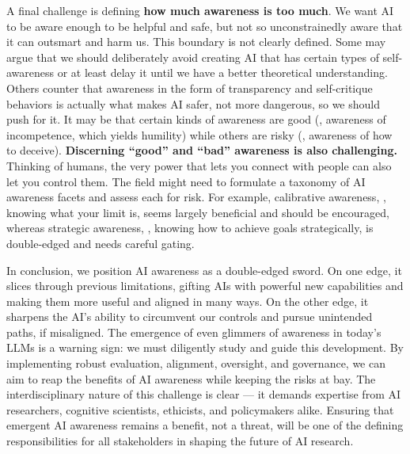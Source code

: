 A final challenge is defining \textbf{how much awareness is too much}. We want AI to be aware enough to be helpful and safe, but not so unconstrainedly aware that it can outsmart and harm us. This boundary is not clearly defined. Some may argue that we should deliberately avoid creating AI that has certain types of self-awareness or at least delay it until we have a better theoretical understanding. Others counter that awareness in the form of transparency and self-critique behaviors is actually what makes AI safer, not more dangerous, so we should push for it. It may be that certain kinds of awareness are good (\eg, awareness of incompetence, which yields humility) while others are risky (\eg, awareness of how to deceive). \textbf{Discerning ``good'' and ``bad'' awareness is also challenging.} Thinking of humans, the very power that lets you connect with people can also let you control them. The field might need to formulate a taxonomy of AI awareness facets and assess each for risk. For example, calibrative awareness, \ie, knowing what your limit is, seems largely beneficial and should be encouraged, whereas strategic awareness, \ie, knowing how to achieve goals strategically, is double-edged and needs careful gating.

In conclusion, we position AI awareness as a double-edged sword. On one edge, it slices through previous limitations, gifting AIs with powerful new capabilities and making them more useful and aligned in many ways. On the other edge, it sharpens the AI’s ability to circumvent our controls and pursue unintended paths, if misaligned. The emergence of even glimmers of awareness in today’s LLMs is a warning sign: we must diligently study and guide this development. By implementing robust evaluation, alignment, oversight, and governance, we can aim to reap the benefits of AI awareness while keeping the risks at bay. The interdisciplinary nature of this challenge is clear --- it demands expertise from AI researchers, cognitive scientists, ethicists, and policymakers alike. Ensuring that emergent AI awareness remains a benefit, not a threat, will be one of the defining responsibilities for all stakeholders in shaping the future of AI research.